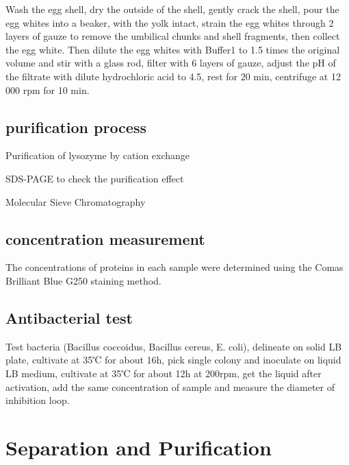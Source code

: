 Wash the egg shell, dry the outside of the shell, gently crack the
shell, pour the egg whites into a beaker, with the yolk intact, strain
the egg whites through 2 layers of gauze to remove the umbilical chunks
and shell fragments, then collect the egg white. Then dilute the egg
whites with Buffer1 to 1.5 times the original volume and stir with a
glass rod, filter with 6 layers of gauze, adjust the pH of the filtrate
with dilute hydrochloric acid to 4.5, rest for 20 min, centrifuge at 12
000 rpm for 10 min.

\hypertarget{purification-process}{%
\subsection{purification process}\label{purification-process}}

Purification of lysozyme by cation exchange

SDS-PAGE to check the purification effect

Molecular Sieve Chromatography

\hypertarget{concentration-measurement}{%
\subsection{concentration measurement}\label{concentration-measurement}}

The concentrations of proteins in each sample were determined using the
Comas Brilliant Blue G250 staining method.

\hypertarget{antibacterial-test}{%
\subsection{Antibacterial test}\label{antibacterial-test}}

Test bacteria (Bacillus coccoidus, Bacillus cereus, E. coli), delineate
on solid LB plate, cultivate at 35℃ for about 16h, pick single colony
and inoculate on liquid LB medium, cultivate at 35℃ for about 12h at
200rpm, get the liquid after activation, add the same concentration of
sample and measure the diameter of inhibition loop.




\section{Separation and Purification}


